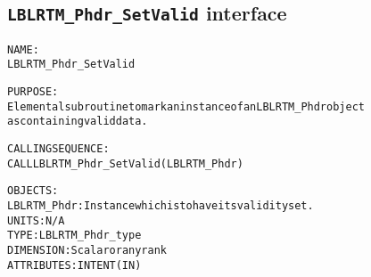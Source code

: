 \subsection{\texttt{LBLRTM\_Phdr\_SetValid} interface}
  \label{sec:LBLRTM_Phdr_SetValid_interface}
  \begin{alltt}
 
  NAME:
        LBLRTM_Phdr_SetValid
 
  PURPOSE:
        Elemental subroutine to mark an instance of an LBLRTM_Phdr object
        as containing valid data.
 
  CALLING SEQUENCE:
        CALL LBLRTM_Phdr_SetValid( LBLRTM_Phdr )
 
  OBJECTS:
        LBLRTM_Phdr:   Instance which is to have its validity set.
                       UNITS:      N/A
                       TYPE:       LBLRTM_Phdr_type
                       DIMENSION:  Scalar or any rank
                       ATTRIBUTES: INTENT(IN)
 
  \end{alltt}
